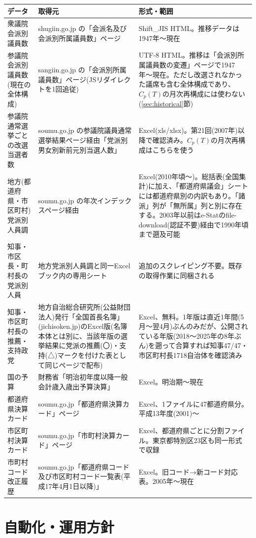 \documentclass[a4paper,11pt]{ltjsarticle}
\begin{document}
\begin{longtable}{p{3.0cm}p{6.4cm}p{5.0cm}}
\toprule
データ & 取得元 & 形式・範囲 \\
\midrule
\endhead
衆議院 会派別議員数 & shugiin.go.jp の「会派名及び会派別所属議員数」ページ & Shift\_JIS HTML。推移データは1947年〜現在 \\
参議院 会派別議員数(現在の全体構成) & sangiin.go.jp の「会派別所属議員数」ページ(JSリダイレクトを1回追従) & UTF-8 HTML。推移は「会派別所属議員数の変遷」ページで1947年〜現在。ただし改選されなかった議席も含む全体構成であり、$C_p(T)$の月次再構成には使わない(\ref{sec:historical}節) \\
参議院 通常選挙ごとの改選当選者数 & soumu.go.jp の参議院議員通常選挙結果ページ経由「党派別男女別新前元別当選人数」 & Excel(xls/xlsx)。第21回(2007年)以降で確認済み。$C_p(T)$の月次再構成はこちらを使う \\
地方(都道府県・市区町村)党派別人員調 & soumu.go.jp の年次インデックスページ経由 & Excel(2010年頃〜)。総括表(全国集計)に加え、「都道府県議会」シートには都道府県別の内訳もあり。「諸派」列が「無所属」列と別に存在する。2003年以前はe-Statのfile-download(認証不要)経由で1990年頃まで遡及可能 \\
知事・市区長・町村長の党派別人員 & 地方党派別人員調と同一Excelブック内の専用シート & 追加のスクレイピング不要。既存の取得作業に同梱される \\
知事・市区町村長の推薦・支持政党 & 地方自治総合研究所(公益財団法人)発行「全国首長名簿」(jichisoken.jp)のExcel版(名簿本体とは別に、当該年版の選挙結果に党派の推薦(〇)・支持(△)マークを付けた表として同じページで配布) & Excel、無料。1年版は直近1年間(5月〜翌4月)ぶんのみだが、公開されている年版(2018〜2025年の8年ぶん)を遡って合算すれば知事47/47・市区町村長1718自治体を確認済み \\
国の予算 & 財務省「明治初年度以降一般会計歳入歳出予算決算」 & Excel。明治期〜現在 \\
都道府県決算カード & soumu.go.jp「都道府県決算カード」ページ & Excel、1ファイルに47都道府県分。平成13年度(2001)〜 \\
市区町村決算カード & soumu.go.jp「市町村決算カード」ページ & Excel、都道府県ごとに分割ファイル。東京都特別区23区も同一形式で収録 \\
市町村コード改正履歴 & soumu.go.jp「都道府県コード及び市区町村コード一覧表(平成17年4月1日以降)」 & Excel。旧コード→新コード対応表。2005年〜現在 \\
\bottomrule
\end{longtable}

\section{自動化・運用方針}
\end{document}

